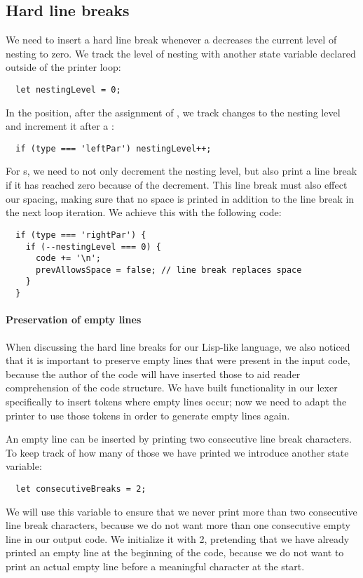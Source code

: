 \subsection{Hard line breaks}
We need to insert a hard line break
whenever a  decreases the
current level of nesting to zero.
We track the level of nesting with another
state variable declared outside of the printer loop:
\begin{verbatim}
  let nestingLevel = 0;
\end{verbatim}

In the  position,
after the assignment of ,
we track changes to the nesting level and
increment it after a :
\begin{verbatim}
  if (type === 'leftPar') nestingLevel++;
\end{verbatim}

For s, we need to
not only decrement the nesting level,
but also print a line break if
it has reached zero because of the decrement.
This line break must also effect our spacing,
making sure that no space is printed
in addition to the line break
in the next loop iteration.
We achieve this with the following code:
\begin{verbatim}
  if (type === 'rightPar') {
    if (--nestingLevel === 0) {
      code += '\n';
      prevAllowsSpace = false; // line break replaces space
    }
  }
\end{verbatim}

\paragraph{Preservation of empty lines}
When discussing the hard line breaks for our Lisp-like language,
we also noticed that it is important
to preserve empty lines that were present in the input code,
because the author of the code will have inserted those
to aid reader comprehension of the code structure.
We have built functionality in our lexer specifically
to insert tokens where empty lines occur;
now we need to adapt the printer to use those tokens
in order to generate empty lines again.

An empty line can be inserted by
printing two consecutive line break characters.
To keep track of how many of those we have printed
we introduce another state variable:
\begin{verbatim}
  let consecutiveBreaks = 2;
\end{verbatim}
We will use this variable to ensure that we never print
more than two consecutive line break characters,
because we do not want
more than one consecutive empty line
in our output code.
We initialize it with 2,
pretending that we have already printed an empty line
at the beginning of the code,
because we do not want to print an actual empty line
before a meaningful character at the start.

